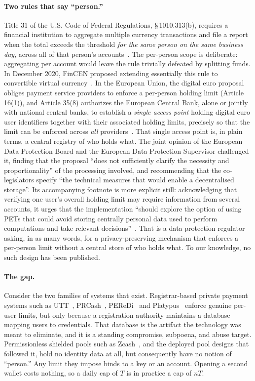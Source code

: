 \documentclass[11pt,a4paper]{article}
\theoremstyle{definition}
\theoremstyle{plain}
\theoremstyle{remark}
\begin{document}
\paragraph{Two rules that say ``person.''}
Title 31 of the U.S. Code of Federal Regulations, \S\,1010.313(b), requires a financial institution to aggregate multiple currency transactions and file a report when the total exceeds the threshold \emph{for the same person on the same business day}, across all of that person's accounts~\cite{cfr1010313}. The per-person scope is deliberate: aggregating per account would leave the rule trivially defeated by splitting funds. In December 2020, FinCEN proposed extending essentially this rule to convertible virtual currency~\cite{fincennprm}. In the European Union, the digital euro proposal obliges payment service providers to enforce a per-person holding limit (Article 16(1)), and Article 35(8) authorizes the European Central Bank, alone or jointly with national central banks, to establish a \emph{single access point} holding digital euro user identifiers together with their associated holding limits, precisely so that the limit can be enforced across \emph{all} providers~\cite{digitaleuro}. That single access point is, in plain terms, a central registry of who holds what. The joint opinion of the European Data Protection Board and the European Data Protection Supervisor challenged it, finding that the proposal ``does not sufficiently clarify the necessity and proportionality'' of the processing involved, and recommending that the co-legislators specify ``the technical measures that would enable a decentralised storage''. Its accompanying footnote is more explicit still: acknowledging that verifying one user's overall holding limit may require information from several accounts, it urges that the implementation ``should explore the option of using PETs that could avoid storing centrally personal data used to perform computations and take relevant decisions''~\cite[paras.~40--41]{edpb2023}. That is a data protection regulator asking, in as many words, for a privacy-preserving mechanism that enforces a per-person limit without a central store of who holds what. To our knowledge, no such design has been published.

\paragraph{The gap.}
Consider the two families of systems that exist. Registrar-based private payment systems such as UTT~\cite{utt}, PRCash~\cite{prcash}, PEReDi~\cite{peredi} and Platypus~\cite{platypus} enforce genuine per-user limits, but only because a registration authority maintains a database mapping users to credentials. That database is the artifact the technology was meant to eliminate, and it is a standing compromise, subpoena, and abuse target. Permissionless shielded pools such as Zcash~\cite{zcash}, and the deployed pool designs that followed it, hold no identity data at all, but consequently have no notion of ``person.'' Any limit they impose binds to a key or an account. Opening a second wallet costs nothing, so a daily cap of $T$ is in practice a cap of $nT$.
\end{document}
